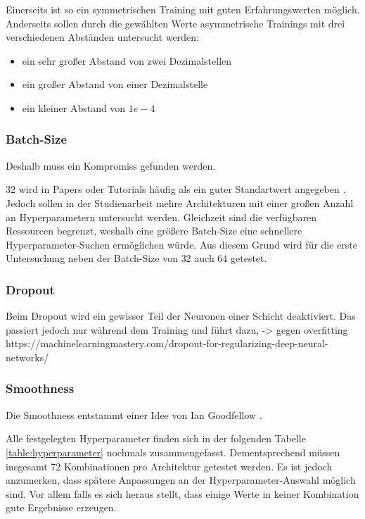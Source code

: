 Einerseits ist so ein symmetrischen Training mit guten Erfahrungswerten möglich.
Anderseits sollen durch die gewählten Werte asymmetrische Trainings mit drei verschiedenen Abständen untersucht werden:
\begin{itemize}
	\item ein sehr großer Abstand von zwei Dezimalstellen
	\item ein großer Abstand von einer Dezimalstelle
	\item ein kleiner Abstand von \(1e-4\)
\end{itemize}	

\subsubsection{Batch-Size}

Deshalb muss ein Kompromiss gefunden werden.
\newline

\(32\) wird in Papers oder Tutorials häufig als ein guter Standartwert angegeben \cite{default-batch-size}.
Jedoch sollen in der Studienarbeit mehre Architekturen mit einer großen Anzahl an Hyperparametern untersucht werden.
Gleichzeit sind die verfügbaren Ressourcen begrenzt, weshalb eine größere Batch-Size eine schnellere Hyperparameter-Suchen ermöglichen würde.
Aus diesem Grund wird für die erste Untersuchung neben der Batch-Size von \(32\) auch \(64\) getestet.

\subsubsection{Dropout}
Beim Dropout wird ein gewisser Teil der Neuronen einer Schicht deaktiviert.
Das passiert jedoch nur während dem Training und führt dazu, -> gegen overfitting
https://machinelearningmastery.com/dropout-for-regularizing-deep-neural-networks/



\subsubsection{Smoothness}
Die Smoothness entstammt einer Idee von Ian Goodfellow \cite{ian-goodfellow-onesided-label-smoothing}.
\newline

Alle festgelegten Hyperparameter finden sich in der folgenden Tabelle \ref{table:hyperparameter} nochmals zusammengefasst.
Dementsprechend müssen insgesamt 72 Kombinationen pro Architektur getestet werden. 
Es ist jedoch anzumerken, dass spätere Anpassungen an der Hyperparameter-Auswahl möglich sind.
Vor allem falls es sich heraus stellt, dass einige Werte in keiner Kombination gute Ergebnisse erzeugen.

